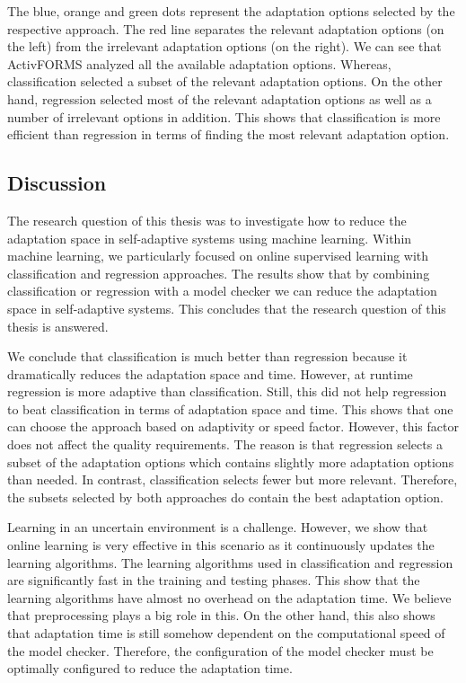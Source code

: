\documentclass[a4paper,12pt]{article}
\begin{document}
The blue, orange and green dots represent the adaptation options selected by the respective approach. The red line separates the relevant adaptation options (on the left) from the irrelevant adaptation options (on the right). We can see that ActivFORMS analyzed all the available adaptation options. Whereas, classification selected a subset of the relevant adaptation options. On the other hand, regression selected most of the relevant adaptation options as well as a number of irrelevant options in addition. This shows that classification is more efficient than regression in terms of finding the most relevant adaptation option.
\subsection{Discussion} \label{Discussion}
The research question of this thesis was to investigate how to reduce the adaptation space in self-adaptive systems using machine learning. Within machine learning, we particularly focused on online supervised learning with classification and regression approaches. The results show that by combining classification or regression with a model checker we can reduce the adaptation space in self-adaptive systems. This concludes that the research question of this thesis is answered.

We conclude that classification is much better than regression because it dramatically reduces the adaptation space and time. However, at runtime regression is more adaptive than classification. Still, this did not help regression to beat classification in terms of adaptation space and time. This shows that one can choose the approach based on adaptivity or speed factor. However, this factor does not affect the quality requirements. The reason is that regression selects a subset of the adaptation options which contains slightly more adaptation options than needed. In contrast, classification selects fewer but more relevant. Therefore, the subsets selected by both approaches do contain the best adaptation option. 

Learning in an uncertain environment is a challenge. However, we show that online learning is very effective in this scenario as it continuously updates the learning algorithms. The learning algorithms used in classification and regression are significantly fast in the training and testing phases. This show that the learning algorithms have almost no overhead on the adaptation time. We believe that preprocessing plays a big role in this. On the other hand, this also shows that adaptation time is still somehow dependent on the computational speed of the model checker. Therefore, the configuration of the model checker must be optimally configured to reduce the adaptation time.
\end{document}
